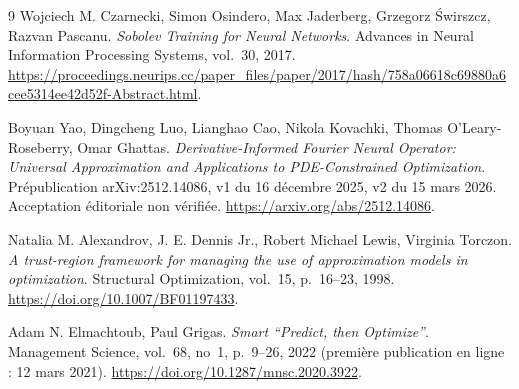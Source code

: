 \begin{thebibliography}{9}
Wojciech M. Czarnecki, Simon Osindero, Max Jaderberg, Grzegorz Świrszcz,
Razvan Pascanu.
\emph{Sobolev Training for Neural Networks}.
Advances in Neural Information Processing Systems, vol.~30, 2017.
\url{https://proceedings.neurips.cc/paper_files/paper/2017/hash/758a06618c69880a6cee5314ee42d52f-Abstract.html}.

Boyuan Yao, Dingcheng Luo, Lianghao Cao, Nikola Kovachki,
Thomas O'Leary-Roseberry, Omar Ghattas.
\emph{Derivative-Informed Fourier Neural Operator: Universal Approximation
and Applications to PDE-Constrained Optimization}.
Prépublication arXiv:2512.14086, v1 du 16 décembre 2025,
v2 du 15 mars 2026. Acceptation éditoriale non vérifiée.
\url{https://arxiv.org/abs/2512.14086}.

Natalia M. Alexandrov, J. E. Dennis Jr., Robert Michael Lewis, Virginia Torczon.
\emph{A trust-region framework for managing the use of approximation models
in optimization}.
Structural Optimization, vol.~15, p.~16--23, 1998.
\url{https://doi.org/10.1007/BF01197433}.

Adam N. Elmachtoub, Paul Grigas.
\emph{Smart \textquotedblleft Predict, then Optimize\textquotedblright}.
Management Science, vol.~68, no~1, p.~9--26, 2022
(première publication en ligne : 12 mars 2021).
\url{https://doi.org/10.1287/mnsc.2020.3922}.
\end{thebibliography}

